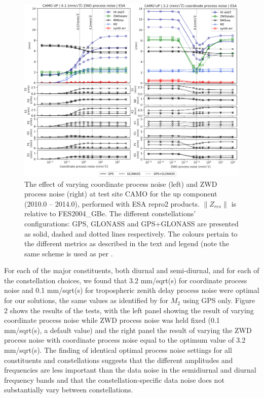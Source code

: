 \documentclass[se, manuscript]{copernicus}
\begin{document}
\begin{figure}[t]
\includegraphics[width=17cm]{fig02.png}
\caption{The effect of varying coordinate process noise (left) and ZWD process noise (right) at test site CAMO for the up component (2010.0 – 2014.0), performed with ESA repro2 products. $\|Z_{res}\|$ is relative to FES2004\_GBe. The different constellations’ configurations: GPS, GLONASS and GPS+GLONASS are presented as solid, dashed and dotted lines respectively. The colours pertain to the different metrics as described in the text and legend (note the same scheme is used as per \cite{Penna2015}. }
\end{figure}

For each of the major constituents, both diurnal and semi-diurnal, and for each of the constellation choices, we found that 3.2 mm/sqrt(s) for coordinate process noise and 0.1 mm/sqrt(s) for tropospheric zenith delay process noise were optimal for our solutions, the same values as identified by \cite{Penna2015} for $M_2$ using GPS only. Figure 2 shows the results of the tests, with the left panel showing the result of varying coordinate process noise while ZWD process noise was held fixed (0.1 mm/sqrt(s), a default value) and the right panel the result of varying the ZWD process noise with coordinate process noise equal to the optimum value of 3.2 mm/sqrt(s). The finding of identical optimal process noise settings for all constituents and constellations suggests that the different amplitudes and frequencies are less important than the data noise in the semidiurnal and diurnal frequency bands and that the constellation-specific data noise does not substantially vary between constellations. 
\end{document}
